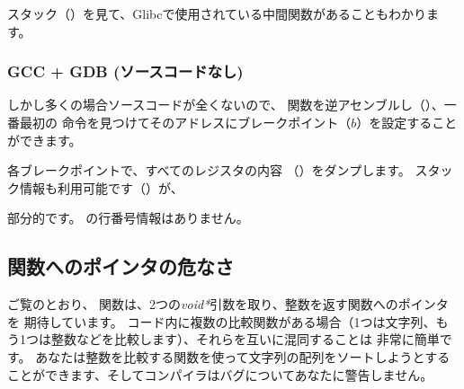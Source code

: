 スタック（）を見て、Glibcで使用されている中間関数があることもわかります。



\subsubsection{GCC + GDB (ソースコードなし)}

しかし多くの場合ソースコードが全くないので、 \comp 関数を逆アセンブルし（）、一番最初の
\CMP 命令を見つけてそのアドレスにブレークポイント（$b$）を設定することができます。

各ブレークポイントで、すべてのレジスタの内容
（）をダンプします。 
スタック情報も利用可能です（）が、

部分的です。 \comp の行番号情報はありません。



\subsection{関数へのポインタの危なさ}

ご覧のとおり、 \qsort 関数は、2つの\emph{void*}引数を取り、整数を返す関数へのポインタを
期待しています。 
コード内に複数の比較関数がある場合（1つは文字列、もう1つは整数などを比較します）、それらを互いに混同することは
非常に簡単です。 
あなたは整数を比較する関数を使って文字列の配列をソートしようとすることができます、そしてコンパイラはバグについてあなたに警告しません。
